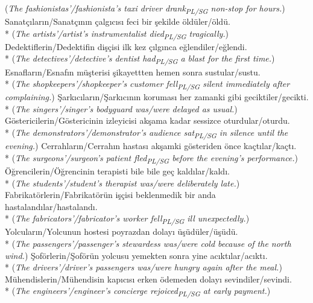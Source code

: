 ({\it The fashionistas'/fashionista's taxi driver drank\textsubscript{PL/SG} non-stop for hours.})
\ex Sanat\c{c}{\i}lar{\i}n/Sanat\c{c}{\i}n{\i}n \c{c}alg{\i}c{\i}s{\i} feci bir \c{s}ekilde \"{o}ld\"{u}ler/\"{o}ld\"{u}.\\*
({\it The artists'/artist's instrumentalist died\textsubscript{PL/SG} tragically.})
\ex Dedektiflerin/Dedektifin di\c{s}\c{c}isi ilk kez \c{c}{\i}lg{\i}nca e\u{g}lendiler/e\u{g}lendi.\\*
({\it The detectives'/detective's dentist had\textsubscript{PL/SG} a blast for the first time.})
\ex Esnaflar{\i}n/Esnaf{\i}n m\"{u}\c{s}terisi \c{s}ikayettten hemen sonra sustular/sustu.\\*
({\it The shopkeepers'/shopkeeper's customer fell\textsubscript{PL/SG} silent immediately after complaining.})
\ex \c{S}ark{\i}c{\i}lar{\i}n/\c{S}ark{\i}c{\i}n{\i}n korumas{\i} her zamanki gibi geciktiler/gecikti.\\*
({\it The singers'/singer's bodyguard was/were delayed as usual.})
\ex G\"{o}stericilerin/G\"{o}stericinin izleyicisi ak\c{s}ama kadar sessizce oturdular/oturdu.\\*
({\it The demonstrators'/demonstrator's audience sat\textsubscript{PL/SG} in silence until the evening.})
\ex Cerrahlar{\i}n/Cerrah{\i}n hastas{\i} ak\c{s}amki g\"{o}steriden \"{o}nce ka\c{c}t{\i}lar/ka\c{c}t{\i}.\\*
({\it The surgeons'/surgeon's patient fled\textsubscript{PL/SG} before the evening's performance.})
\ex \"{O}\u{g}rencilerin/\"{O}\u{g}rencinin terapisti bile bile ge\c{c} kald{\i}lar/kald{\i}.\\*
({\it The students'/student's therapist was/were deliberately late.})
\ex Fabrikat\"{o}rlerin/Fabrikat\"{o}r\"{u}n i\c{s}\c{c}isi beklenmedik bir anda hastaland{\i}lar/hastaland{\i}.\\*
({\it The fabricators'/fabricator's worker fell\textsubscript{PL/SG} ill unexpectedly.})
\ex Yolcular{\i}n/Yolcunun hostesi poyrazdan dolay{\i} \"{u}\c{s}\"{u}d\"{u}ler/\"{u}\c{s}\"{u}d\"{u}.\\*
({\it The passengers'/passenger's stewardess was/were cold because of the north wind.})
\ex \c{S}of\"{o}rlerin/\c{S}of\"{o}r\"{u}n yolcusu yemekten sonra yine ac{\i}kt{\i}lar/ac{\i}kt{\i}.\\*
({\it The drivers'/driver's passengers was/were hungry again after the meal.})
\ex M\"{u}hendislerin/M\"{u}hendisin kap{\i}c{\i}s{\i} erken \"{o}demeden dolay{\i} sevindiler/sevindi.\\*
({\it The engineers'/engineer's concierge rejoiced\textsubscript{PL/SG} at early payment.})
